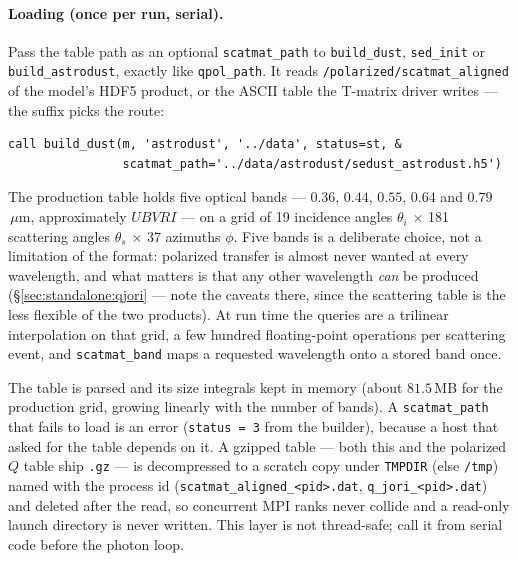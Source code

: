 \documentclass{my_memo}
\newcommand{\code}[1]{\texttt{#1}}
\newcommand{\um}{\ensuremath{\,\mu\mathrm{m}}}
\begin{document}
\paragraph{Loading (once per run, serial).} Pass the table path as an optional
\code{scatmat\_path} to \code{build\_dust}, \code{sed\_init} or
\code{build\_astrodust}, exactly like \code{qpol\_path}. It reads
\code{/polarized/scatmat\_aligned} of the model's HDF5 product, or the ASCII
table the T-matrix driver writes --- the suffix picks the route:
\begin{lstlisting}
call build_dust(m, 'astrodust', '../data', status=st, &
                scatmat_path='../data/astrodust/sedust_astrodust.h5')
\end{lstlisting}
The production table holds five optical bands --- $0.36$, $0.44$, $0.55$, $0.64$
and $0.79$\um, approximately $UBVRI$ --- on a grid of 19 incidence angles
$\theta_i$ $\times$ 181 scattering angles $\theta_s$ $\times$ 37 azimuths
$\phi$. Five bands is a deliberate choice, not a limitation of the format:
polarized transfer is almost never wanted at every wavelength, and what matters
is that any other wavelength \emph{can} be produced (\S\ref{sec:standalone:qjori}
--- note the caveats there, since the scattering table is the less flexible of
the two products). At run time the queries are a trilinear interpolation on that
grid, a few hundred floating-point operations per scattering event, and
\code{scatmat\_band} maps a requested wavelength onto a stored band once.

The table is parsed and its size integrals kept in memory (about $81.5$\,MB for the
production grid, growing linearly with the number of bands). A
\code{scatmat\_path} that fails to load is an error
(\code{status = 3} from the builder), because a host that asked for the table
depends on it. A gzipped table --- both this and the polarized $Q$ table ship
\code{.gz} --- is decompressed to a scratch copy under \code{TMPDIR} (else
\code{/tmp}) named with the process id (\code{scatmat\_aligned\_<pid>.dat},
\code{q\_jori\_<pid>.dat}) and deleted after the read, so concurrent MPI ranks
never collide and a read-only launch directory is never written. This layer is not
thread-safe; call it from serial code before the photon loop.
\end{document}
